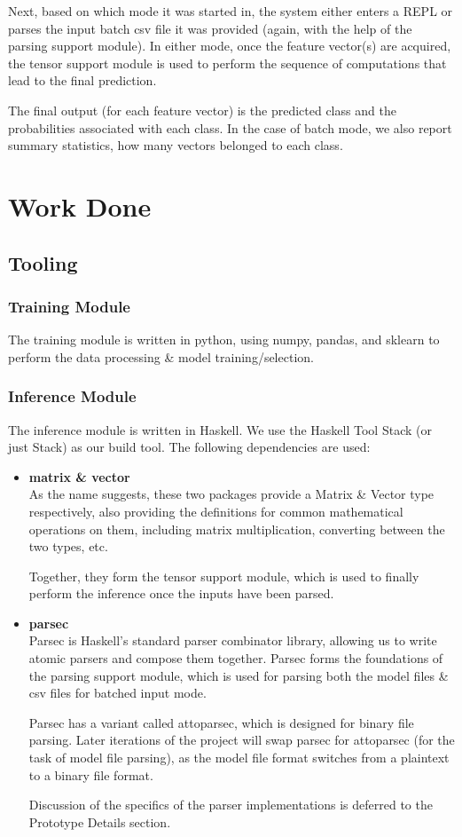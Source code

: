 \documentclass[12pt, titlepage]{article}
\begin{document}
Next, based on which mode it was started in, the system either enters a REPL or parses the input batch csv file it was provided (again, with the help of the parsing support module). In either mode, once the feature vector(s) are acquired, the tensor support module is used to perform the sequence of computations that lead to the final prediction.\bigskip

The final output (for each feature vector) is the predicted class and the probabilities associated with each class. In the case of batch mode, we also report summary statistics, how many vectors belonged to each class.

\section{Work Done}
\subsection{Tooling}
\subsubsection{Training Module}
The training module is written in python, using numpy, pandas, and sklearn to perform the data processing \& model training/selection.\bigskip

\subsubsection{Inference Module}
The inference module is written in Haskell. We use the Haskell Tool Stack (or just Stack) as our build tool. The following dependencies are used:
\begin{itemize}
	\item \textbf{matrix \& vector}\\
	As the name suggests, these two packages provide a Matrix \& Vector type respectively, also providing the definitions for common mathematical operations on them, including matrix multiplication, converting between the two types, etc.\bigskip

	Together, they form the tensor support module, which is used to finally perform the inference once the inputs have been parsed.

	\item \textbf{parsec}\\
	Parsec is Haskell's standard parser combinator library, allowing us to write atomic parsers and compose them together. Parsec forms the foundations of the parsing support module, which is used for parsing both the model files \& csv files for batched input mode.\bigskip

	Parsec has a variant called attoparsec, which is designed for binary file parsing. Later iterations of the project will swap parsec for attoparsec (for the task of model file parsing), as the model file format switches from a plaintext to a binary file format.

	Discussion of the specifics of the parser implementations is deferred to the Prototype Details section.
\end{itemize}
\end{document}
